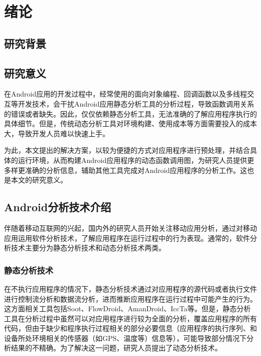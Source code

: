 \section{绪论}
\label{ch1}

\subsection{研究背景}
\subsection{研究意义}

在Android应用的开发过程中，经常使用的面向对象编程、回调函数以及多线程交互等开发技术，会干扰Android应用静态分析工具的分析过程，导致函数调用关系的错误或者缺失。因此，仅仅依赖静态分析工具，无法准确的了解应用程序执行的具体细节。但是，传统动态分析工具对环境构建、使用成本等方面需要投入的成本大，导致开发人员难以快速上手。

为此，本文提出的解决方案，以较为便捷的方式对应用程序进行预处理，并结合具体的运行环境，从而构建Android应用程序的动态函数调用图，为研究人员提供更多样更准确的分析信息，辅助其他工具完成对Android应用程序的分析工作。这也是本文的研究意义。
\subsection{	Android分析技术介绍}

伴随着移动互联网的兴起，国内外的研究人员开始关注移动应用分析，通过对移动应用运用软件分析技术，了解应用程序在运行过程中的行为表现。通常的，软件分析技术主要分为静态分析技术和动态分析技术两类。

\subsubsection{静态分析技术}
在不执行应用程序的情况下，静态分析技术通过对应用程序的源代码或者执行文件进行控制流分析和数据流分析，进而推断应用程序在运行过程中可能产生的行为。这方面相关工具包括Soot、FlowDroid、AmanDroid、IccTa等。但是，静态分析工具在分析过程中虽然可以对应用程序进行较为全面的分析，覆盖应用程序的所有代码，但由于缺少和程序执行过程相关的部分必要信息（应用程序的执行序列、和设备所处环境相关的传感器（如GPS、温度等）信息等），可能导致部分情况下分析结果的不精确。为了解决这一问题，研究人员提出了动态分析技术。

